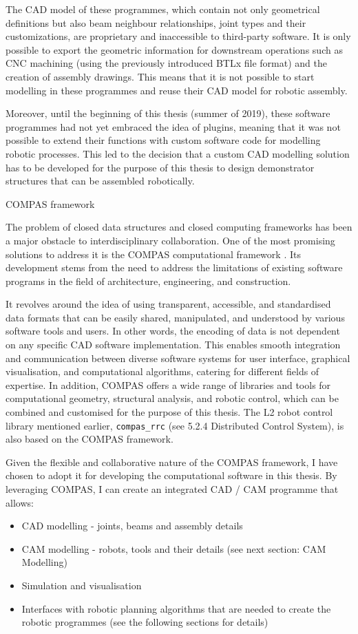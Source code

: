 The CAD model of these programmes, which contain not only geometrical definitions but also beam neighbour relationships, joint types and their customizations, are proprietary and inaccessible to third-party software. It is only possible to export the geometric information for downstream operations such as CNC machining (using the previously introduced BTLx file format) and the creation of assembly drawings. This means that it is not possible to start modelling in these programmes and reuse their CAD model for robotic assembly. 

Moreover, until the beginning of this thesis (summer of 2019), these software programmes had not yet embraced the idea of plugins, meaning that it was not possible to extend their functions with custom software code for modelling robotic processes. This led to the decision that a custom CAD modelling solution has to be developed for the purpose of this thesis to design demonstrator structures that can be assembled robotically.

COMPAS framework

The problem of closed data structures and closed computing frameworks has been a major obstacle to interdisciplinary collaboration. One of the most promising solutions to address it is the COMPAS computational framework \parencite{meleCOMPASFrameworkComputational2017}. Its development stems from the need to address the limitations of existing software programs in the field of architecture, engineering, and construction.

It revolves around the idea of using transparent, accessible, and standardised data formats that can be easily shared, manipulated, and understood by various software tools and users. In other words, the encoding of data is not dependent on any specific CAD software implementation. This enables smooth integration and communication between diverse software systems for user interface, graphical visualisation, and computational algorithms, catering for different fields of expertise. In addition, COMPAS offers a wide range of libraries and tools for computational geometry, structural analysis, and robotic control, which can be combined and customised for the purpose of this thesis. The L2 robot control library mentioned earlier, \verb|compas_rrc| \parencite{fleischmannCOMPASRRCOnline2020} (see 5.2.4 Distributed Control System), is also based on the COMPAS framework.

Given the flexible and collaborative nature of the COMPAS framework, I have chosen to adopt it for developing the computational software in this thesis. By leveraging COMPAS, I can create an integrated CAD / CAM programme that allows:
\begin{itemize}
    \item CAD modelling - joints, beams and assembly details
    \item CAM modelling - robots, tools and their details (see next section: CAM Modelling)
    \item Simulation and visualisation
    \item Interfaces with robotic planning algorithms that are needed to create the robotic programmes (see the following sections for details)
\end{itemize}

